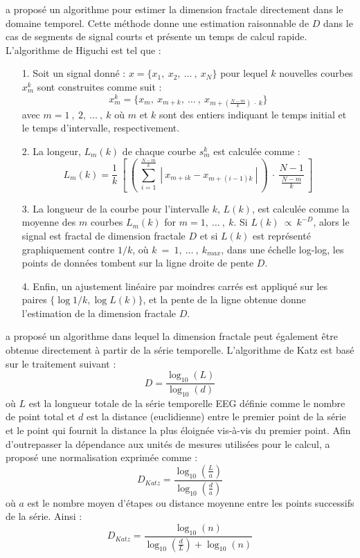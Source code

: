 \cite{higuchi1988approach} a proposé un algorithme pour estimer la dimension fractale directement dans le domaine temporel. 
Cette méthode donne une estimation raisonnable de $D$ dans le cas de segments de signal courts et présente un temps de calcul rapide. 
L'algorithme de Higuchi est tel que : \\

\begin{itemize}
\item[1.] Soit un signal donné : $x=\{x_1,~x_2,~\ldots~,~x_N\}$ pour lequel $k$ nouvelles courbes $x_m^k$ sont construites comme suit :
\begin{equation}
x_m^k=\{x_m,~x_{m+k},~\ldots~,~x_{m+(\frac{N-m}{k})~\cdot~k}\}
\end{equation}
avec $m=1~,~2,~\ldots~,~k$ où $m$ et $k$ sont des entiers indiquant le temps initial et le temps d'intervalle, respectivement. 
\item[2.] La longeur, $L_m(k)$ de chaque courbe $s_m^k$ est calculée comme : 
\begin{equation}
L_m(k)=\frac{1}{k}~\left[~\left(~\sum_{i=1}^{\frac{N-m}{k}}~|~x_{m+ik}- x_{m+(i-1)k}~|~\right)~\cdot~\frac{N-1}{\frac{N-m}{k}}~\right]
\end{equation}
\item[3.] La longueur de la courbe pour l'intervalle $k$, $L(k)$, est calculée comme la moyenne des $m$ courbes $L_m(k)$ for $m=1,~\ldots~,~k$. 
Si $L(k)~\propto~k^{-D}$, alors le signal est fractal de dimension fractale $D$ et si $L(k)$ est représenté graphiquement contre $1/k$, où $k~=~1,~\ldots~,~k_{max}$, dans une échelle log-log, les points de données tombent sur la ligne droite de pente $D$. 
\item[4.] Enfin, un ajustement linéaire par moindres carrés est appliqué sur les paires $\{\log 1/k, \log L(k)\}$, et la pente de la ligne obtenue donne l'estimation de la dimension fractale $D$. 
\end{itemize}

\cite{katz1988fractals} a proposé un algorithme dans lequel la dimension fractale peut également être obtenue directement à partir de la série temporelle. 
L'algorithme de Katz est basé sur le traitement suivant : \\
\begin{equation}
D = \frac{\log_{10} (L) }{\log_{10} (d)}
\end{equation}
où $L$ est la longueur totale de la série temporelle EEG définie comme le nombre de point total et $d$ est la distance (euclidienne) entre le premier point de la série et le point qui fournit la distance la plus éloignée vis-à-vis du premier point. 
Afin d'outrepasser la dépendance aux unités de mesures utilisées pour le calcul, \cite{katz1988fractals} a proposé une normalisation exprimée comme :
\begin{equation}
D_{Katz} = \frac{\log_{10} (\frac{L}{a}) }{\log_{10} (\frac{d}{a})}
\end{equation}
où $a$ est le nombre moyen d'étapes ou distance moyenne entre les points successifs de la série. Ainsi :
\begin{equation}
D_{Katz} = \frac{\log_{10} (n) }{\log_{10} (\frac{d}{L}) + \log_{10}(n)}
\end{equation}

